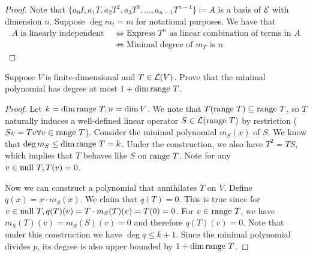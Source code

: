 \documentclass{extarticle}
\begin{document}
\begin{proof}
Note that \(\{a_0 I, a_1 T, a_2 T^2, a_3 T^3, \ldots, a_{n-1} T^{n-1}\} \coloneqq A\) is a basis of \(\mathcal{E}\) with dimension \(n\). 
Suppose \(\deg m_t = m\) for notational purposes. We have that 
\begin{align*}
    A \text{ is linearly independent } &\Leftrightarrow \text{Express } T^n \text{ as linear combination of terms in } A \\ 
    &\Leftrightarrow \text{Minimal degree of } m_T \text{ is } n 
\end{align*}



\end{proof}


\begin{problem}{21}
    Suppose \(V\) is finite-dimensional and \(T \in \mathcal{L}(V)\). Prove that the minimal polynomial has 
    degree at most \(1 + \dim \text{range } T\).
\end{problem}

\begin{proof}

Let \(k = \dim \text{range } T, n = \dim V\). We note that \(T(\text{range } T) \subseteq \text{range } T\), so \(T\)
naturally induces a well-defined linear operator \(S \in \mathcal{L}(\text{range } T)\) by restriction (\(Sv=Tv \forall  v 
\in \text{range } T\)). Consider the minimal polynomial \(m_S(x)\) of \(S\). We know that \(\deg m_S \leq \dim 
\text{range } T = k\). Under the construction, we also have \(T^2 = TS\), which implies that \(T\) behaves like 
\(S\) on \(\text{range } T\). Note for any \(v \in \text{null } T, T(v) = 0\). 

Now we can construct a polynomial that annihilates \(T\) on \(V\). Define \(q(x) = x \cdot m_S(x)\). We 
claim that \(q(T) = 0\). This is true since for \(v \in \text{null } T, q(T)(v) = T \cdot m_S(T)(v) = T(0) = 0\). 
For \(v \in \text{range } T\), we have \(m_S(T)(v) = m_S(S)(v) = 0\) and therefore \(q(T)(v) = 0\). Note that 
under this construction we have \(\deg q \leq k + 1\). Since the minimal polynomial divides \(p\), its 
degree is also upper bounded by \(1 + \dim \text{range } T\). 








\end{proof}
\end{document}
